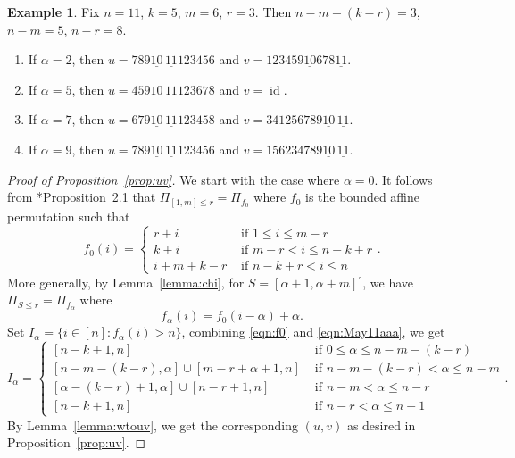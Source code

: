 \documentclass[12pt,reqno]{amsart}
\theoremstyle{definition}
\newtheorem{example}[lemma]{Example}
\newcommand{\id}{\operatorname{id}}
\begin{document}
{\begin{example}
    \label{ex:uv}
    Fix $n=11$, $k=5$, $m=6$, $r=3$. Then $n-m-(k-r)=3$, $n-m=5$, $n-r=8$.
    \begin{enumerate}
        \item If $\alpha=2$, then $u=789\underline{10}\,\underline{11}123456$ and $v=123459\underline{10}678\underline{11}$.
        \item If $\alpha=5$, then $u=459\underline{10}\,\underline{11}123678$ and $v=\id$.
        \item If $\alpha=7$, then $u=679\underline{10}\,\underline{11}123458$ and $v=341256789\underline{10}\,\underline{11}$.
        \item If $\alpha=9$, then $u=789\underline{10}\,\underline{11}123456$ and $v=156234789\underline{10}\,\underline{11}$.
    \end{enumerate}
\end{example}

\begin{proof}[Proof of Proposition~\ref{prop:uv}] 
We start with the case where $\alpha = 0$. It follows from \cite{K14interval}*{Proposition~2.1} that 
$\Pi_{[1,m]\leq r} = \Pi_{f_0}$ where $f_0$ is the bounded affine permutation such that
\begin{equation}\label{eqn:f0}
    f_0(i) = \begin{cases}
    r+i & \text{ if }1\leq i\leq m-r\\
    k+i & \text{ if }m-r<i\leq n-k+r\\
    i+m+k-r & \text{ if }n-k+r<i\leq n
\end{cases}.
\end{equation}
More generally, by Lemma~\ref{lemma:chi}, for $S = [\alpha+1,\alpha+m]^{\circ}$, we have $\Pi_{S\leq r} = \Pi_{f_\alpha}$ where
\begin{equation}\label{eqn:May11aaa}
    f_\alpha(i) = f_0(i-\alpha)+\alpha.
\end{equation}
Set $I_\alpha = \{i\in [n]:f_\alpha(i)>n\}$, combining  \eqref{eqn:f0} and \eqref{eqn:May11aaa}, we get 
\begin{equation}\label{eqn:May11bbb}
    I_\alpha = \begin{cases}
        [n-k+1,n] & \text{ if }0\leq \alpha\leq n-m-(k-r)\\
        [n-m-(k-r),\alpha]\cup [m-r+\alpha+1,n] & \text{ if }n-m-(k-r)<\alpha\leq n-m\\
        [\alpha-(k-r)+1,\alpha]\cup[n-r+1,n] &\text{ if }n-m<\alpha\leq n-r\\
        [n-k+1,n]&\text{ if }n-r<\alpha\leq n-1
    \end{cases}.
\end{equation}
By Lemma~\ref{lemma:wtouv}, we get the corresponding $(u,v)$ as desired in Proposition~\ref{prop:uv}.
\end{proof}

}
\end{document}
